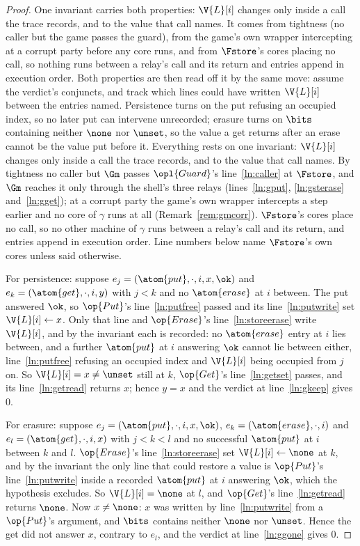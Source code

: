 \documentclass[10pt,oneside,openany]{book}
\theoremstyle{accentdef}
\theoremstyle{accentplain}
\begin{document}
\begin{proof}
One invariant carries both properties: $\V{L}[i]$ changes only inside a call the trace records, and
to the value that call names. It comes from tightness (no caller but the game passes the guard), from
the game's own wrapper intercepting at a corrupt party before any core runs, and from $\Fstore$'s
cores placing no call, so nothing runs between a relay's call and its return and entries append in
execution order. Both properties are then read off it by the same move: assume the verdict's
conjuncts, and track which lines could have written $\V{L}[i]$ between the entries named. Persistence
turns on the put refusing an occupied index, so no later put can intervene unrecorded; erasure turns
on $\bits$ containing neither $\none$ nor $\unset$, so the value a get returns after an erase cannot
be the value put before it.
Everything rests on one invariant: $\V{L}[i]$ changes only inside a call the trace records, and to
the value that call names. By tightness no caller but $\Gm$ passes $\opl{Guard}$'s
line~\ref{ln:caller} at
$\Fstore$, and $\Gm$ reaches it only through the shell's three relays (lines~\ref{ln:gput},
\ref{ln:gsterase} and~\ref{ln:gget});
at a corrupt party the game's own wrapper intercepts a step earlier and no core
of $\gamma$ runs at all (Remark~\ref{rem:gmcorr}). $\Fstore$'s cores place no call, so no other
machine of $\gamma$ runs between a relay's call and its return, and entries append in execution
order. Line numbers below name $\Fstore$'s own cores unless said otherwise.

For persistence: suppose $e_j = (\atom{put},\cdot,i,x,\ok)$ and $e_k = (\atom{get},\cdot,i,y)$ with
$j < k$ and no $\atom{erase}$ at $i$ between. The put answered $\ok$, so $\op{Put}$'s
line~\ref{ln:putfree}
passed and its line~\ref{ln:putwrite} set $\V{L}[i] \gets x$. Only that line
and $\op{Erase}$'s line~\ref{ln:storeerase} write $\V{L}[i]$, and by the invariant each is
recorded: no $\atom{erase}$
entry at $i$ lies between, and a further $\atom{put}$ at $i$ answering $\ok$ cannot lie between
either, line~\ref{ln:putfree} refusing an occupied index and $\V{L}[i]$ being occupied from $j$
on. So $\V{L}[i] = x \neq \unset$ still at $k$, $\op{Get}$'s line~\ref{ln:getset} passes, and its
line~\ref{ln:getread} returns $x$; hence $y = x$ and the verdict at line~\ref{ln:gkeep} gives $0$.

For erasure: suppose $e_j = (\atom{put},\cdot,i,x,\ok)$, $e_k = (\atom{erase},\cdot,i)$ and
$e_l = (\atom{get},\cdot,i,x)$ with $j < k < l$ and no successful $\atom{put}$ at $i$ between $k$ and
$l$. $\op{Erase}$'s line~\ref{ln:storeerase} set $\V{L}[i] \gets \none$ at $k$, and by the
invariant the only
line that could restore a value is $\op{Put}$'s line~\ref{ln:putwrite} inside a recorded
$\atom{put}$ at $i$
answering $\ok$, which the hypothesis excludes. So $\V{L}[i] = \none$ at $l$, and $\op{Get}$'s
line~\ref{ln:getread} returns $\none$. Now $x \neq \none$: $x$ was written by
line~\ref{ln:putwrite} from a $\op{Put}$'s argument, and $\bits$ contains neither $\none$ nor
$\unset$. Hence the get did not answer $x$, contrary to $e_l$, and the verdict at
line~\ref{ln:ggone} gives $0$.
\end{proof}
\end{document}
